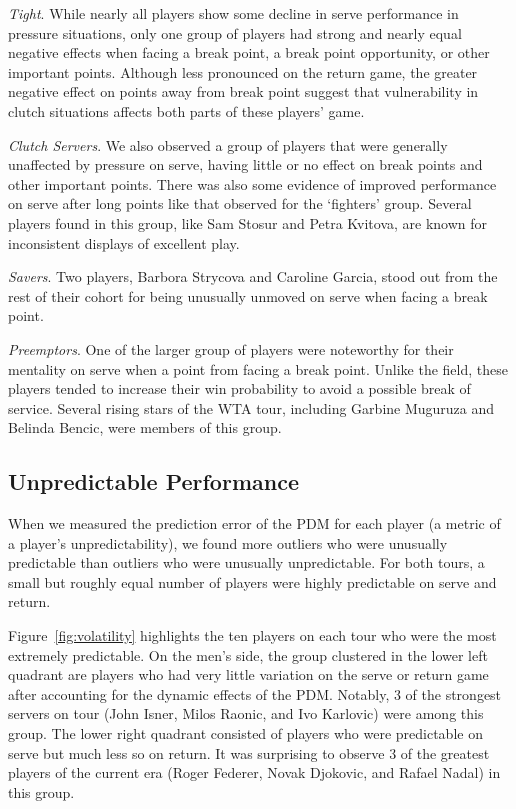 \documentclass{Latex/svjour3}
\begin{document}
\textit{Tight}. While nearly all players show some decline in serve
performance in pressure situations, only one group of players had
strong and nearly equal negative effects when facing a break point, a
break point opportunity, or other important points.  Although less
pronounced on the return game, the greater negative effect on points
away from break point suggest that vulnerability in clutch
situations affects both parts of these players' game. 

\textit{Clutch Servers}. We also observed a group of players that were
generally unaffected by pressure on serve, having little or no
effect on break points and other important points. There was also some
evidence of improved performance on serve after long points like that
observed for the `fighters' group. Several players found in this
group, like Sam Stosur and Petra
Kvitova, are known for
inconsistent displays of excellent play.

\textit{Savers}. Two players, Barbora Strycova and Caroline Garcia, stood out from the rest of their cohort
for being unusually unmoved on serve when facing a break point.

\textit{Preemptors}. One of the larger group of players were
noteworthy for their mentality on serve when a point from facing a
break point. Unlike the field, these players tended to increase their
win probability to avoid a possible break of service. Several rising
stars of the WTA tour, including Garbine Muguruza and Belinda Bencic,
were members of this group.


\subsection{Unpredictable Performance}

When we measured the prediction error of the PDM for each player (a
metric of a player's unpredictability), we found more outliers who
were unusually predictable than outliers who were unusually
unpredictable. For both tours, a small
but roughly equal number of players were highly predictable on serve
and return. 

Figure~\ref{fig:volatility} highlights the ten players on
each tour who were the most extremely predictable. On the men's side,
the group clustered in the lower left quadrant are players who had
very little variation on the serve or return game after accounting for
the dynamic effects of the PDM. Notably, 3 of the strongest servers on
tour (John Isner, Milos Raonic, and Ivo Karlovic) were among this
group. The lower right quadrant consisted of players who were
predictable on serve but much less so on return. It was surprising to
observe 3 of the greatest players of the current era (Roger Federer,
Novak Djokovic, and Rafael Nadal) in this group. 
\end{document}
